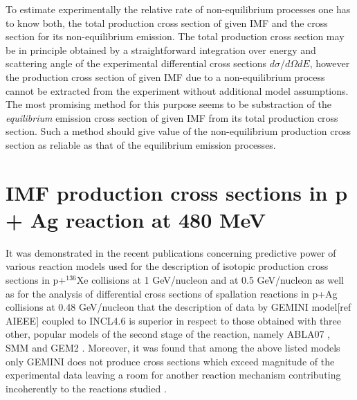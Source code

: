 To estimate experimentally the relative rate of non-equilibrium
processes one has to know both, the total production cross section
of given IMF and the cross section for its non-equilibrium emission.
The total production cross section may be in principle obtained by a
straightforward integration over energy and scattering angle of the
experimental differential cross sections $d\sigma/d\Omega dE$,
however the production cross section of given IMF due to a
non-equilibrium process cannot be extracted from the experiment
without additional model assumptions.  The most promising method for
this purpose seems to be substraction of the \emph{equilibrium}
emission cross section of given IMF  from its total production cross
section. Such a method should give value of the non-equilibrium
production cross section as reliable as that of the equilibrium
emission processes.  %
\section{IMF production cross sections in p + Ag reaction at 480 MeV}


It was demonstrated in the recent publications concerning predictive
power of various reaction models used for the description of
isotopic production cross sections in p+$^{136}$Xe collisions at 1
GeV/nucleon \cite{singh2018predictive} and at 0.5 GeV/nucleon \cite{sharma2017ranking}
as well as for the analysis of differential cross sections of
spallation reactions in p+Ag collisions at 0.48 GeV/nucleon
\cite{sharma2016ranking} that the description of data by GEMINI model\cite{CHARITY1988,Charity2010}[ref AIEEE] coupled to INCL4.6
\cite{boudard2013new} is superior in respect to those obtained with
three other, popular models of the second stage of the reaction,
namely ABLA07 \cite{kelic2009abla07}, SMM \cite{SMMBondorf1995} and GEM2 \cite{FURIHATA2000,Furihata2002}. Moreover, it was found that among
the above listed models only GEMINI does not produce cross sections
which exceed magnitude of the experimental data leaving a room for
another reaction mechanism contributing incoherently to the
reactions studied \cite{sharma2016ranking}.





